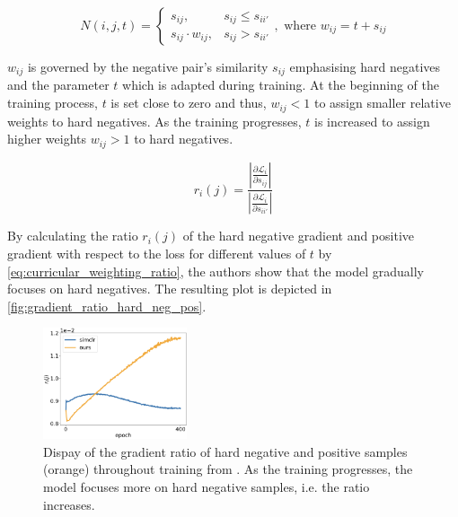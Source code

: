 \begin{equation}
    N(i,j,t) = \left\{\begin{array}{ll} s_{ij}, & s_{ij} \le s_{ii'} \\
        s_{ij} \cdot  w_{ij}, & s_{ij} > s_{ii'}\end{array}\right. ,\text{ where }w_{ij} = t + s_{ij}
    \label{eq:curricular_negative_weighting}
\end{equation}

$w_{ij}$ is governed by the negative pair's similarity $s_{ij}$ emphasising hard negatives 
and the parameter $t$ which is adapted during training.
At the beginning of the training process, $t$ is set close to zero and thus, $w_{ij} < 1$ 
to assign smaller relative weights to hard negatives.
As the training progresses, $t$ is increased to assign higher weights $w_{ij} > 1$ to hard negatives.

\begin{equation}
    r_i(j) = \frac{\left| \frac{\partial \mathcal{L}_i}{\partial s_{ij}} \right|}
    {\left| \frac{\partial \mathcal{L}_i}{\partial s_{ii'}} \right|}
    \label{eq:curricular_weighting_ratio}
\end{equation}


By calculating the ratio $r_i(j)$ of the hard negative gradient and positive gradient 
with respect to the loss for different values of $t$ by \eqref{eq:curricular_weighting_ratio}, 
the authors show that the model gradually focuses on hard negatives.
The resulting plot is depicted in \autoref{fig:gradient_ratio_hard_neg_pos}.

\begin{figure}[h] %
    \centering
    \includegraphics[width=120pt]{images/ratio_hard_neg_pos_gradients.png}
    \caption{Dispay of the gradient ratio of hard negative and positive samples (orange) throughout training 
    from \citet{curricular_weighting_2024}.
    As the training progresses, the model focuses more on hard negative samples, i.e. the ratio increases.
    }
    \label{fig:gradient_ratio_hard_neg_pos}
\end{figure}

